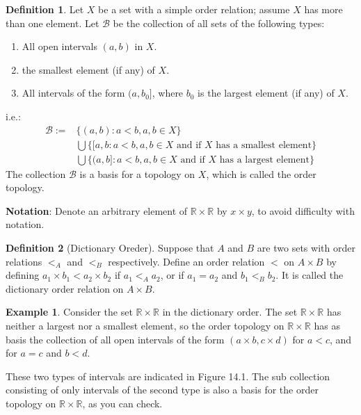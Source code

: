 \documentclass[
]{book}
\providecommand{\tightlist}{%
  \setlength{\itemsep}{0pt}\setlength{\parskip}{0pt}}
\theoremstyle{definition}
\newtheorem{definition}{Definition}[chapter]
\theoremstyle{definition}
\newtheorem{example}{Example}[chapter]
\theoremstyle{definition}
\theoremstyle{definition}
\theoremstyle{remark}
\begin{document}
\begin{definition}
\protect\hypertarget{def:unnamed-chunk-27}{}\label{def:unnamed-chunk-27}Let \(X\) be a set with a simple order relation; assume \(X\) has more than one element. Let \(\mathcal{B}\) be the collection of all sets of the following types:

\begin{enumerate}
\def\labelenumi{\arabic{enumi}.}
\tightlist
\item
  All open intervals \((a, b)\) in \(X\).
\item
  the smallest element (if any) of \(X\).
\item
  All intervals of the form \((a, b_0]\), where \(b_0\) is the largest element (if any) of \(X\).
\end{enumerate}

i.e.:
\[\begin{aligned}
\mathcal{B}:=&\{(a,b):a<b, a,b\in X\}\\
& \bigcup \{[a,b:a<b, a,b\in X \text{ and if $X$ has a smallest element}\}\\
& \bigcup \{(a,b]:a<b, a,b\in X \text{ and if $X$ has a largest element}\}
\end{aligned}\]
The collection \(\mathcal{B}\) is a basis for a topology on \(X\), which is called the order topology.
\end{definition}

\textbf{Notation}:
Denote an arbitrary element of \(\mathbb{R} \times \mathbb{R}\) by \(x \times y\), to avoid difficulty with notation.

\begin{definition}[Dictionary Oreder]
\protect\hypertarget{def:unnamed-chunk-28}{}\label{def:unnamed-chunk-28}Suppose that \(A\) and \(B\) are two sets with order relations \(<_{A}\) and \(<_{B}\) respectively. Define an order relation \(<\) on \(A \times B\) by defining \(a_{1} \times b_{1} < a_{2} \times b_{2}\) if \(a_{1} <_{A} a_{2}\), or if \(a_{1} = a_{2}\) and \(b_{1} <_{B} b_{2}\). It is called the dictionary order relation on \(A \times B\).
\end{definition}

\begin{example}
\protect\hypertarget{exm:unnamed-chunk-29}{}\label{exm:unnamed-chunk-29}Consider the set \(\mathbb{R} \times \mathbb{R}\) in the dictionary order. The set \(\mathbb{R} \times \mathbb{R}\) has neither a largest nor a smallest element, so the order topology on \(\mathbb{R} \times \mathbb{R}\) has as basis the collection of all open intervals of the form \((a \times b, c \times d)\) for \(a < c\), and for \(a = c\) and \(b < d\).

These two types of intervals are indicated in Figure 14.1. The sub collection consisting of only intervals of the second type is also a basis for the order topology on \(\mathbb{R} \times \mathbb{R}\), as you can check.
\end{example}
\end{document}

